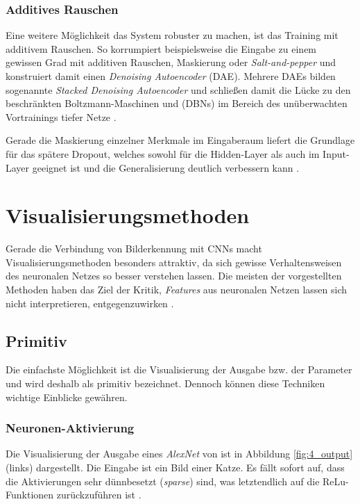 \subsubsection{Additives Rauschen}
Eine weitere Möglichkeit das System robuster zu machen, ist das Training mit additivem Rauschen. So korrumpiert beispielsweise \cite{Vincent2008} die Eingabe zu einem gewissen Grad mit additiven Rauschen, Maskierung oder \textit{Salt-and-pepper} und konstruiert damit einen \textit{Denoising Autoencoder} (DAE). Mehrere DAEs bilden sogenannte \textit{Stacked Denoising Autoencoder} und schließen damit die Lücke zu den beschränkten Boltzmann-Maschinen und (DBNs) im Bereich des unüberwachten Vortrainings tiefer Netze \cite[vgl.][]{Vincent2010}.

Gerade die Maskierung einzelner Merkmale im Eingaberaum liefert die Grundlage für das spätere Dropout, welches sowohl für die Hidden-Layer als auch im Input-Layer geeignet ist und die Generalisierung deutlich verbessern kann \cite[vgl.][]{Srivastava2014}.


\section{Visualisierungsmethoden}
Gerade die Verbindung von Bilderkennung mit CNNs macht Visualisierungsmethoden besonders attraktiv, da sich gewisse Verhaltensweisen des neuronalen Netzes so besser verstehen lassen.
Die meisten der vorgestellten Methoden haben das Ziel der Kritik, \textit{Features} aus neuronalen Netzen lassen sich nicht interpretieren, entgegenzuwirken \cite[vgl.][]{Zeiler2014}.

\subsection{Primitiv}

Die einfachste Möglichkeit ist die Visualisierung der Ausgabe bzw. der Parameter und wird deshalb als primitiv bezeichnet. Dennoch können diese Techniken wichtige Einblicke gewähren.

\subsubsection{Neuronen-Aktivierung}

Die Visualisierung der Ausgabe eines \textit{AlexNet} von \cite{Krizhevsky2012} ist in Abbildung \ref{fig:4_output} (links) dargestellt. Die Eingabe ist ein Bild einer Katze. Es fällt sofort auf, dass die Aktivierungen sehr dünnbesetzt (\textit{sparse}) sind, was letztendlich auf die ReLu-Funktionen zurückzuführen ist \cite[vgl.][]{Glorot2011}.


